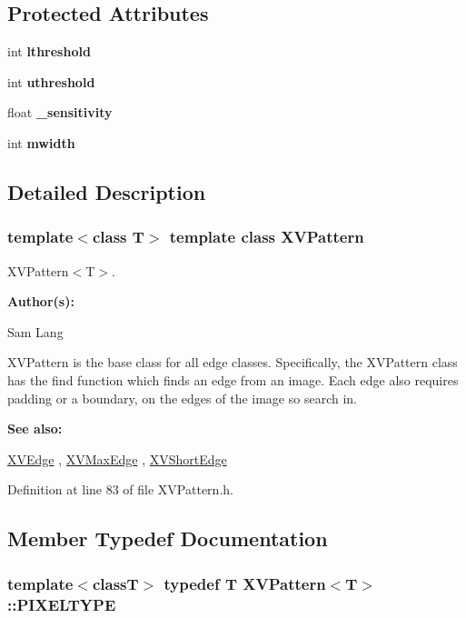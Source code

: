 \subsection*{Protected Attributes}
\begin{CompactItemize}
\item 
int {\bf lthreshold}
\item 
int {\bf uthreshold}
\item 
float {\bf \_\-sensitivity}
\item 
int {\bf mwidth}
\end{CompactItemize}


\subsection{Detailed Description}
\subsubsection*{template$<$class T$>$  template class XVPattern}

XVPattern$<$T$>$.

\begin{Desc}
\item[{\bf Author(s): }]\par
 Sam Lang

\end{Desc}
XVPattern is the base class for all edge classes. Specifically, the XVPattern class has the find function which finds an edge from an image. Each edge also requires padding or a boundary, on the edges of the image so search in.

\begin{Desc}
\item[{\bf See also: }]\par
 \hyperlink{class_XVEdge}{XVEdge} ,  \hyperlink{class_XVMaxEdge}{XVMax\-Edge} ,  \hyperlink{class_XVShortEdge}{XVShort\-Edge} \end{Desc}




Definition at line 83 of file XVPattern.h.

\subsection{Member Typedef Documentation}
\label{XVPattern_s0}
\hypertarget{class_XVPattern_s0}{
\subsubsection[PIXELTYPE]{\setlength{\rightskip}{0pt plus 5cm}template$<$classT$>$ typedef T XVPattern$<$T$>$::PIXELTYPE}}




